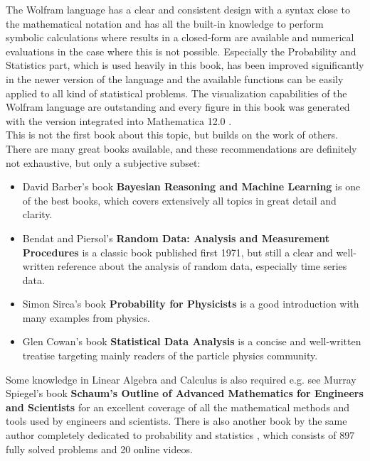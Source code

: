 \documentclass{tstextbook}
\begin{document}
The Wolfram language \cite{wolfram2015, don2018} has a clear and consistent design with a syntax close to the mathematical notation and has all the built-in knowledge to perform symbolic calculations where results in a closed-form are available and numerical evaluations in the case where this is not possible. Especially the Probability and Statistics part, which is used heavily in this book, has been improved significantly in the newer version of the language and the available functions can be easily applied to all kind of statistical problems. The visualization capabilities of the Wolfram language are outstanding and every figure in this book was generated with the version integrated into Mathematica 12.0 \cite{mathematica12}.\\

This is not the first book about this topic, but builds on the work of others. There are many great books available, and these recommendations are definitely not exhaustive, but only a subjective subset:

\begin{itemize}
\item 
David Barber's book \textbf{Bayesian Reasoning and Machine Learning} \cite{barber2011} is one of the best books, which covers extensively all topics in great detail and clarity.
\item
Bendat and Piersol's \textbf{Random Data: Analysis and Measurement Procedures} \cite{bendat2010} is a classic book published first 1971, but still a clear and well-written reference about the analysis of random data, especially time series data.
\item
Simon Sirca's book \textbf{Probability for Physicists} \cite{sirca2016} is a good introduction with many examples from physics.
\item
Glen Cowan's book \textbf{Statistical Data Analysis} \cite{cowan1998} is a concise and well-written treatise targeting mainly readers of the particle physics community.   
\end{itemize}

Some knowledge in Linear Algebra and Calculus is also required e.g. see Murray Spiegel's book \textbf{Schaum's Outline of Advanced Mathematics for Engineers and Scientists} \cite{spiegel2009} for an excellent coverage of all the mathematical methods and tools used by engineers and scientists. There is also another book by the same author completely dedicated to probability and statistics \cite{spiegel2012}, which consists of 897 fully solved problems and 20 online videos.\\
\end{document}
